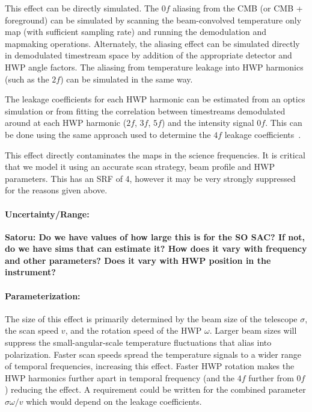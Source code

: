 This effect can be directly simulated. The $0f$ aliasing from the CMB (or CMB + foreground) can be simulated by scanning the beam-convolved temperature only map (with sufficient sampling rate) and running the demodulation and mapmaking operations. Alternately, the aliasing effect can be simulated directly in demodulated timestream space by addition of the appropriate detector and HWP angle factors. The aliasing from temperature leakage into HWP harmonics (such as the $2f$) can be simulated in the same way.


The leakage coefficients for each HWP harmonic can be estimated from an optics simulation or from fitting the correlation between timestreams demodulated around at each HWP harmonic ($2f$, $3f$, $5f$) and the intensity signal $0f$.
This can be done using the same approach used to determine the $4f$ leakage coefficients~\cite{Essinger-Hileman2016,Didier_Thesis,PB1_WHWP}.


This effect directly contaminates the maps in the science frequencies. It is critical that we model it using an accurate scan strategy, beam profile and HWP parameters. This has an SRF of 4, however it may be very strongly suppressed for the reasons given above.

\paragraph{Uncertainty/Range:}
\textbf{Satoru: Do we have values of how large this is for the SO SAC? If not, do we have sims that can estimate it? How does it vary with frequency and other parameters? Does it vary with HWP position in the instrument?}

\paragraph{Parameterization:}
The size of this effect is primarily determined by the beam size of the telescope $\sigma$, the scan speed $v$, and the rotation speed of the HWP $\omega$. Larger beam sizes will suppress the small-angular-scale temperature fluctuations that alias into polarization. Faster scan speeds spread the temperature signals to a wider range of temporal frequencies, increasing this effect. Faster HWP rotation makes the HWP harmonics further apart in temporal frequency (and the $4f$ further from $0f$) reducing the effect. A requirement could be written for the combined parameter $\sigma\omega/v$ which would depend on the leakage coefficients.
